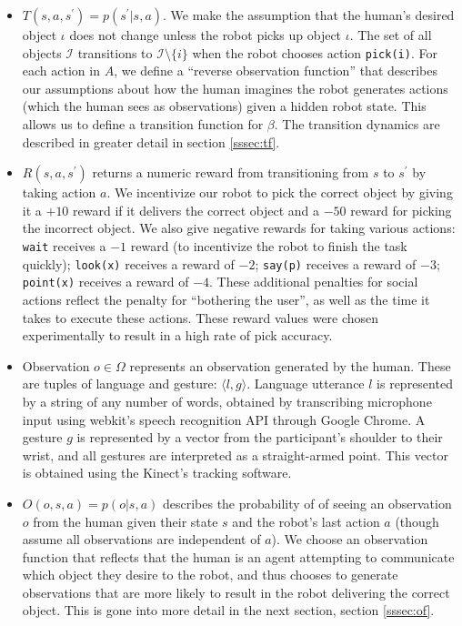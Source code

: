 \documentclass[conference]{IEEEtran}
\newcommand{\Iota}{\mathcal{I}}
\begin{document}
\begin{itemize}
	\item $T(s, a, s^\prime) = p(s^\prime | s, a)$. We make the assumption that the human's desired object $\iota$ does not change unless the robot picks up object $\iota$. The set of all objects $\Iota$ transitions to $\Iota \setminus \{i\}$ when the robot chooses action \texttt{pick(i)}. For each action in $A$, we define a ``reverse observation function'' that describes our assumptions about how the human imagines the robot generates actions (which the human sees as observations) given a hidden robot state. This allows us to define a transition function for $\beta$. The transition dynamics are described in greater detail in section  \ref{sssec:tf}. 
	\item $R(s, a, s^\prime)$ returns a numeric reward from transitioning from $s$ to $s^\prime$ by taking action $a$. We incentivize our robot to pick the correct object by giving it a $+10$ reward if it delivers the correct object and a $-50$ reward for picking the incorrect object. We also give negative rewards for taking various actions: \texttt{wait} receives a $-1$ reward (to incentivize the robot to finish the task quickly); \texttt{look(x)} receives a reward of $-2$; \texttt{say(p)} receives a reward of $-3$; \texttt{point(x)}  receives a reward of $-4$. These additional penalties for social actions reflect the penalty for ``bothering the user'', as well as the time it takes to execute these actions. These reward values were chosen experimentally to result in a high rate of pick accuracy. 
	\item Observation $o \in \Omega$ represents an observation generated by the human. These are tuples of language and gesture: $\langle l, g \rangle$. Language utterance $l$ is represented by a string of any number of words, obtained by transcribing microphone input using webkit's speech recognition API through Google Chrome.  A gesture $g$ is represented by a vector from the participant's shoulder to their wrist, and all gestures are interpreted as a straight-armed point. This vector is obtained using the Kinect's tracking software. 
	\item $O(o, s, a) = p(o |s, a)$ describes the probability of of seeing an observation $o$ from the human given their state $s$ and the robot's last action $a$ (though assume all observations are independent of $a$). We choose an observation function that reflects that the human is an agent attempting to communicate which object they desire to the robot, and thus chooses to generate observations that are more likely to result in the robot delivering the correct object. This is gone into more detail in the next section, section \ref{sssec:of}. 
\end{itemize}
\end{document}
